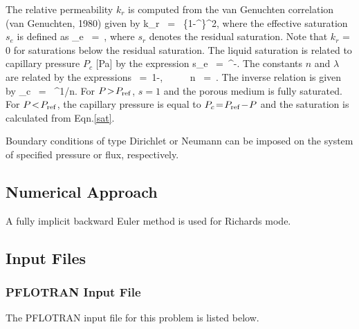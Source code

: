 \documentclass[12pt]{article}
\def\EQ#1\EN{\begin{equation}#1\end{equation}}
\newcommand{\eq}{\ =\ }
\begin{document}
The relative permeability $k_r$ is computed from the van Genuchten correlation (van Genuchten, 1980) given by
\EQ\label{krl} 
k_{r} \eq {} \left\{1-^\lambda \right\}^2, 
\EN 
where the effective saturation $s_e$ is defined as
\EQ 
s_e \eq {}, 
\EN 
where $s_r$ denotes the residual saturation. Note that $k_{r}$ = 0 for saturations below the residual saturation. 
The liquid saturation is related to capillary pressure $P_c$ [Pa] by the expression
\EQ\label{sat}
s_e \eq {}^{-\lambda}. 
\EN 
The constants $n$ and $\lambda$ are related by the expressions 
\EQ\label{lambda} 
\lambda \eq 1-, \ \ \ \ \ n \eq {}. 
\EN 
The inverse relation is given by
\EQ
P_c \eq {} ^{1/n}.
\EN
For $P\!>\!P_{\rm ref}$, $s\!=\!1$ and the porous medium is fully saturated. 
For $P\!<\!P_{\rm ref}$, the capillary pressure is equal to $P_c \!=\! P_{\rm ref} \!-\!P$ and the saturation is calculated from Eqn.\eqref{sat}.

Boundary conditions of type Dirichlet or Neumann can be imposed on the system of specified pressure or flux, respectively.

\subsection{Numerical Approach}

A fully implicit backward Euler method is used for Richards mode.

\subsection{Input Files}

\subsubsection{PFLOTRAN Input File}

The PFLOTRAN input file for this problem is listed below.

\tiny
\end{document}
